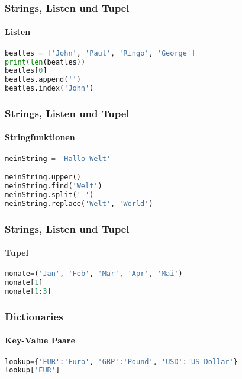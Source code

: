\documentclass[12pt,ngerman]{beamer}
\begin{document}
\begin{frame}[fragile]
\frametitle{Strings, Listen und Tupel}
\framesubtitle{Listen}

\begin{lstlisting}[language={Python},caption={Listen}]
beatles = ['John', 'Paul', 'Ringo', 'George']
print(len(beatles))
beatles[0]
beatles.append('')
beatles.index('John')
\end{lstlisting}
\end{frame}


\begin{frame}[fragile]
\frametitle{Strings, Listen und Tupel}
\framesubtitle{Stringfunktionen}

\begin{lstlisting}[language={Python},caption={Strings}]
meinString = 'Hallo Welt'

meinString.upper()
meinString.find('Welt')
meinString.split(' ')
meinString.replace('Welt', 'World')
\end{lstlisting}
\end{frame}


\begin{frame}[fragile]
\frametitle{Strings, Listen und Tupel}
\framesubtitle{Tupel}

\begin{lstlisting}[language={Python},caption={Tupel}]
monate=('Jan', 'Feb', 'Mar', 'Apr', 'Mai')
monate[1]
monate[1:3]
\end{lstlisting}
\end{frame}


\begin{frame}[fragile]
\frametitle{Dictionaries}
\framesubtitle{Key-Value Paare}

\begin{lstlisting}[language={Python},caption={Dictionaries}]
lookup={'EUR':'Euro', 'GBP':'Pound', 'USD':'US-Dollar'}
lookup['EUR']
\end{lstlisting}
\end{frame}
\end{document}
